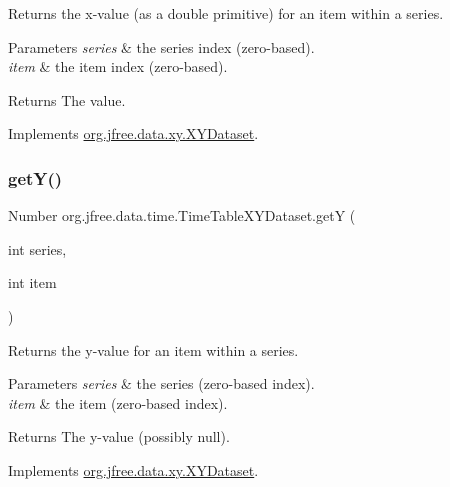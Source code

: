 Returns the x-\/value (as a double primitive) for an item within a series.


\begin{DoxyParams}{Parameters}
{\em series} & the series index (zero-\/based). \\
\hline
{\em item} & the item index (zero-\/based).\\
\hline
\end{DoxyParams}
\begin{DoxyReturn}{Returns}
The value. 
\end{DoxyReturn}


Implements \mbox{\hyperlink{interfaceorg_1_1jfree_1_1data_1_1xy_1_1_x_y_dataset_a65bd212539d8f7dfb3d3d36b5f42e083}{org.\+jfree.\+data.\+xy.\+X\+Y\+Dataset}}.

\mbox{\label{classorg_1_1jfree_1_1data_1_1time_1_1_time_table_x_y_dataset_a774346f32546e4722886bf5b837d6d7a}} 
\subsubsection{\texorpdfstring{get\+Y()}{getY()}}
{\footnotesize\ttfamily Number org.\+jfree.\+data.\+time.\+Time\+Table\+X\+Y\+Dataset.\+getY (\begin{DoxyParamCaption}\item[{int}]{series,  }\item[{int}]{item }\end{DoxyParamCaption})}

Returns the y-\/value for an item within a series.


\begin{DoxyParams}{Parameters}
{\em series} & the series (zero-\/based index). \\
\hline
{\em item} & the item (zero-\/based index).\\
\hline
\end{DoxyParams}
\begin{DoxyReturn}{Returns}
The y-\/value (possibly {\ttfamily null}). 
\end{DoxyReturn}


Implements \mbox{\hyperlink{interfaceorg_1_1jfree_1_1data_1_1xy_1_1_x_y_dataset_aa915867221e0f94021bad3140db5254e}{org.\+jfree.\+data.\+xy.\+X\+Y\+Dataset}}.


